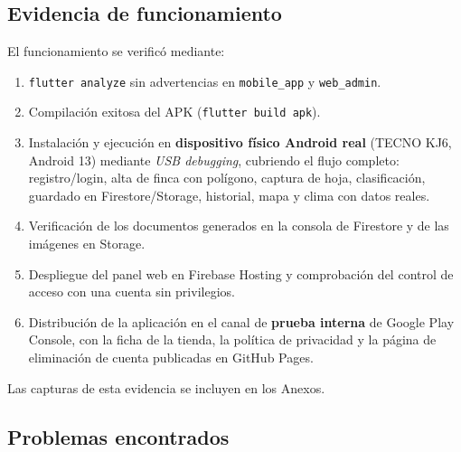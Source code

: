\documentclass[12pt,a4paper]{article}
\begin{document}
\subsection{Evidencia de funcionamiento}

El funcionamiento se verificó mediante:

\begin{enumerate}
  \item \texttt{flutter analyze} sin advertencias en \texttt{mobile\_app} y
        \texttt{web\_admin}.
  \item Compilación exitosa del APK (\texttt{flutter build apk}).
  \item Instalación y ejecución en \textbf{dispositivo físico Android real}
        (TECNO KJ6, Android 13) mediante \textit{USB debugging}, cubriendo el
        flujo completo: registro/login, alta de finca con polígono, captura de
        hoja, clasificación, guardado en Firestore/Storage, historial, mapa y
        clima con datos reales.
  \item Verificación de los documentos generados en la consola de Firestore y de
        las imágenes en Storage.
  \item Despliegue del panel web en Firebase Hosting y comprobación del control
        de acceso con una cuenta sin privilegios.
  \item Distribución de la aplicación en el canal de \textbf{prueba interna} de
        Google Play Console, con la ficha de la tienda, la política de privacidad
        y la página de eliminación de cuenta publicadas en GitHub Pages.
\end{enumerate}

Las capturas de esta evidencia se incluyen en los Anexos.

\subsection{Problemas encontrados}
\label{sec:problemas}
\end{document}
